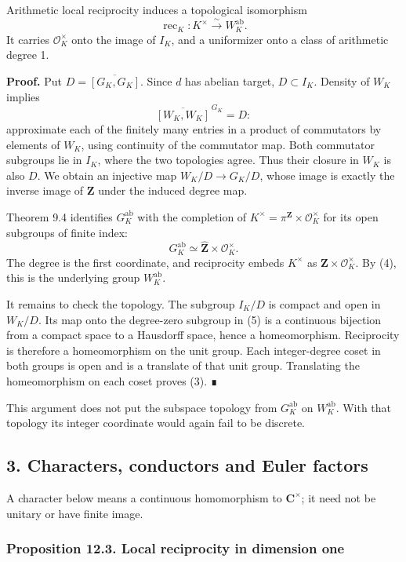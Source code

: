 \documentclass[11pt,a4paper]{article}
\begin{document}
Arithmetic local reciprocity induces a topological isomorphism \[
\operatorname{rec}_K:K^\times\xrightarrow{\ \sim\ }W_K^{\mathrm{ab}}.
\tag{3}
\] It carries \(\mathcal O_K^\times\) onto the image of \(I_K\), and a
uniformizer onto a class of arithmetic degree 1.

\textbf{Proof.} Put \(D=\overline{[G_K,G_K]}\). Since \(d\) has abelian
target, \(D\subset I_K\). Density of \(W_K\) implies \[
\overline{[W_K,W_K]}^{\,G_K}=D:
\tag{4}
\] approximate each of the finitely many entries in a product of
commutators by elements of \(W_K\), using continuity of the commutator
map. Both commutator subgroups lie in \(I_K\), where the two topologies
agree. Thus their closure in \(W_K\) is also \(D\). We obtain an
injective map \(W_K/D\to G_K/D\), whose image is exactly the inverse
image of \(\mathbf Z\) under the induced degree map.

Theorem 9.4 identifies \(G_K^{\mathrm{ab}}\) with the completion of
\(K^\times=\pi^{\mathbf Z}\times\mathcal O_K^\times\) for its open
subgroups of finite index: \[
G_K^{\mathrm{ab}}\simeq\widehat{\mathbf Z}\times\mathcal O_K^\times.
\tag{5}
\] The degree is the first coordinate, and reciprocity embeds
\(K^\times\) as \(\mathbf Z\times\mathcal O_K^\times\). By (4), this is
the underlying group \(W_K^{\mathrm{ab}}\).

It remains to check the topology. The subgroup \(I_K/D\) is compact and
open in \(W_K/D\). Its map onto the degree-zero subgroup in (5) is a
continuous bijection from a compact space to a Hausdorff space, hence a
homeomorphism. Reciprocity is therefore a homeomorphism on the unit
group. Each integer-degree coset in both groups is open and is a
translate of that unit group. Translating the homeomorphism on each
coset proves (3). ∎

This argument does not put the subspace topology from
\(G_K^{\mathrm{ab}}\) on \(W_K^{\mathrm{ab}}\). With that topology its
integer coordinate would again fail to be discrete.

\subsection{3. Characters, conductors and Euler
factors}\label{characters-conductors-and-euler-factors}

A character below means a continuous homomorphism to
\(\mathbf C^\times\); it need not be unitary or have finite image.

\subsubsection{Proposition 12.3. Local reciprocity in dimension
one}\label{proposition-12.3.-local-reciprocity-in-dimension-one}
\end{document}
